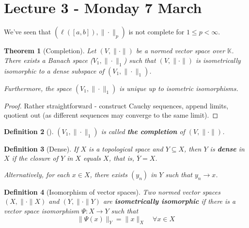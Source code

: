 \documentclass[12pt, oneside, a4paper]{article}
\newtheorem{thm}{Theorem}[section]
\theoremstyle{dfn}
\newtheorem{dfn}[thm]{Definition}
\newcommand{\K}{\mathbb{K}}
\begin{document}
\section{Lecture 3 - Monday 7 March} %
\label{sec:lecture_3_monday_7_march}
We've seen that $(\ell([a,b]), \| \cdot \|_p)$ is not complete for $1 \leq p < \infty$.  

\begin{thm}[Completion] Let $(V, \| \cdot \| )$ be a normed vector space over $\K$.  There exists a Banach space ($V_1, \| \cdot \|_1$) such that $( V, \| \cdot \|)$ is isometrically isomorphic to a dense subspace of $(V_1, \| \cdot \|_1)$.  
    
    Furthermore, the space $( V_1, \| \cdot \|_1)$ is unique up to isometric isomorphisms.  
\end{thm}

\begin{proof}
    Rather straightforward - construct Cauchy sequences, append limits, quotient out (as different sequences may converge to the same limit).
\end{proof}

\begin{dfn}[] $(V_1, \| \cdot \|_1)$ is called \textbf{the completion} of $(V, \| \cdot \|)$. 
\end{dfn}

\begin{dfn}[Dense]
    If $X$ is a topological space and $Y \subseteq X$, then $Y$ is \textbf{dense} in $X$ if the closure of $Y$ in $X$ equals $X$, that is, $\overline{Y} = X$.

Alternatively, for each $x \in X$, there exists $(y_n)$ in $Y$ such that $y_n \rightarrow x$.
\end{dfn}

\begin{dfn}[Isomorphism of vector spaces]
    Two normed vector spaces $(X, \| \cdot \|X)$ and $(Y, \| \cdot \|Y)$ are \textbf{isometrically isomorphic} if there is a vector space isomorphism $\Psi: X \rightarrow Y$ such that \[
        \| \Psi(x) \|_Y = \| x \|_X \quad \forall x \in X
    \]
\end{dfn}
\end{document}
